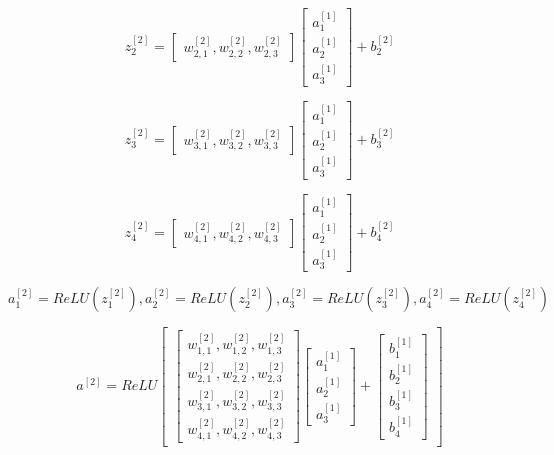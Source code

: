 \documentclass{article}
\begin{document}
\[
z_2^{[2]}=
\begin{bmatrix}
w_{2,1}^{[2]},w_{2,2}^{[2]},w_{2,3}^{[2]}
\end{bmatrix}
\begin{bmatrix}
a_1^{[1]} \\ a_2^{[1]} \\ a_3^{[1]}
\end{bmatrix}
+ b_2^{[2]}
\]

\[
z_3^{[2]}=
\begin{bmatrix}
w_{3,1}^{[2]},w_{3,2}^{[2]},w_{3,3}^{[2]}
\end{bmatrix}
\begin{bmatrix}
a_1^{[1]} \\ a_2^{[1]} \\ a_3^{[1]}
\end{bmatrix}
+ b_3^{[2]}
\]


\[
z_4^{[2]}=
\begin{bmatrix}
w_{4,1}^{[2]},w_{4,2}^{[2]},w_{4,3}^{[2]}
\end{bmatrix}
\begin{bmatrix}
a_1^{[1]} \\ a_2^{[1]} \\ a_3^{[1]}
\end{bmatrix}
+ b_4^{[2]}
\]

\[ a_1^{[2]} = ReLU( z_1^{[2]}), a_2^{[2]} = ReLU( z_2^{[2]}), a_3^{[2]} = ReLU( z_3^{[2]}), a_4^{[2]} = ReLU( z_4^{[2]}) \]


\[a^{[2]} = ReLU 
\begin{bmatrix}
\begin{bmatrix}
w_{1,1}^{[2]},w_{1,2}^{[2]},w_{1,3}^{[2]} \\ 
w_{2,1}^{[2]},w_{2,2}^{[2]},w_{2,3}^{[2]} \\ 
w_{3,1}^{[2]},w_{3,2}^{[2]},w_{3,3}^{[2]} \\
w_{4,1}^{[2]},w_{4,2}^{[2]},w_{4,3}^{[2]}
\end{bmatrix}
\begin{bmatrix}
a_1^{[1]} \\ a_2^{[1]} \\ a_3^{[1]}
\end{bmatrix} +
\begin{bmatrix}
b_1^{[1]} \\ b_2^{[1]} \\ b_3^{[1]} \\ b_4^{[1]}
\end{bmatrix} 
\end{bmatrix}
\]
\end{document}
